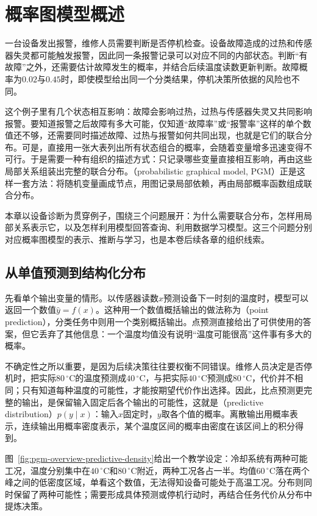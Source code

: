 \chapter{概率图模型概述}
\label{chap:pgm-overview}

一台设备发出报警，维修人员需要判断是否停机检查。设备故障造成的过热和传感器失灵都可能触发报警，因此同一条报警记录可以对应不同的内部状态。判断“有故障”之外，还需要估计故障发生的概率，并结合后续温度读数更新判断。故障概率为$0.02$与$0.45$时，即使模型给出同一个分类结果，停机决策所依据的风险也不同。

这个例子里有几个状态相互影响：故障会影响过热，过热与传感器失灵又共同影响报警。要知道报警之后故障有多大可能，仅知道“故障率”或“报警率”这样的单个数值还不够，还需要同时描述故障、过热与报警如何共同出现，也就是它们的联合分布。可是，直接用一张大表列出所有状态组合的概率，会随着变量增多迅速变得不可行。于是需要一种有组织的描述方式：只记录哪些变量直接相互影响，再由这些局部关系组装出完整的联合分布。（probabilistic graphical model, PGM）正是这样一套方法：将随机变量画成节点，用图记录局部依赖，再由局部概率函数组成联合分布。

本章以设备诊断为贯穿例子，围绕三个问题展开：为什么需要联合分布，怎样用局部关系表示它，以及怎样利用模型回答查询、利用数据学习模型。这三个问题分别对应概率图模型的表示、推断与学习，也是本卷后续各章的组织线索。

\section{从单值预测到结构化分布}
\label{sec:pgm-overview-distribution-prediction}

先看单个输出变量的情形。以传感器读数$x$预测设备下一时刻的温度时，模型可以返回一个数值$\hat y=f(x)$。这种用一个数值概括输出的做法称为（point prediction），分类任务中则用一个类别概括输出。点预测直接给出了可供使用的答案，但它丢弃了其他信息：一个温度均值没有说明“温度可能很高”这件事有多大的概率。

不确定性之所以重要，是因为后续决策往往要权衡不同错误。维修人员决定是否停机时，把实际$80\,^\circ\mathrm{C}$的温度预测成$40\,^\circ\mathrm{C}$，与把实际$40\,^\circ\mathrm{C}$预测成$80\,^\circ\mathrm{C}$，代价并不相同；只有知道每种温度的可能性，才能按期望代价作出选择。因此，比点预测更完整的输出，是保留输入固定后各个输出的可能性，这就是（predictive distribution）$p(y\mid x)$：输入$x$固定时，$y$取各个值的概率。离散输出用概率表示，连续输出用概率密度表示，某个温度区间的概率由密度在该区间上的积分得到。

图~\ref{fig:pgm-overview-predictive-density}给出一个教学设定：冷却系统有两种可能工况，温度分别集中在$40\,^\circ\mathrm{C}$和$80\,^\circ\mathrm{C}$附近，两种工况各占一半。均值$60\,^\circ\mathrm{C}$落在两个峰之间的低密度区域，单看这个数值，无法得知设备可能处于高温工况。分布则同时保留了两种可能性；需要形成具体预测或停机行动时，再结合任务代价从分布中提炼决策。

